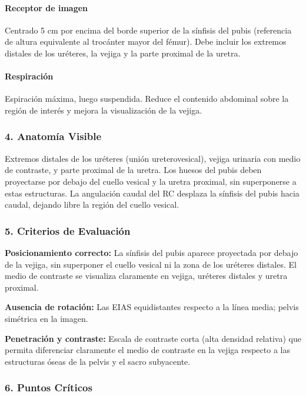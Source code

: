 	\paragraph{Receptor de imagen}
	Centrado 5 cm por encima del borde superior de la sínfisis del pubis (referencia de altura equivalente al trocánter mayor del fémur). Debe incluir los extremos distales de los uréteres, la vejiga y la parte proximal de la uretra.
	
	\paragraph{Respiración}
	Espiración máxima, luego suspendida. Reduce el contenido abdominal sobre la región de interés y mejora la visualización de la vejiga.
	
	\subsubsection*{4. Anatomía Visible}
	
	Extremos distales de los uréteres (unión ureterovesical), vejiga urinaria con medio de contraste, y parte proximal de la uretra. Los huesos del pubis deben proyectarse por debajo del cuello vesical y la uretra proximal, sin superponerse a estas estructuras. La angulación caudal del RC desplaza la sínfisis del pubis hacia caudal, dejando libre la región del cuello vesical.
	
	\subsubsection*{5. Criterios de Evaluación}
	
	\textbf{Posicionamiento correcto:} La sínfisis del pubis aparece proyectada por debajo de la vejiga, sin superponer el cuello vesical ni la zona de los uréteres distales. El medio de contraste se visualiza claramente en vejiga, uréteres distales y uretra proximal.
	
	\textbf{Ausencia de rotación:} Las EIAS equidistantes respecto a la línea media; pelvis simétrica en la imagen.
	
	\textbf{Penetración y contraste:} Escala de contraste corta (alta densidad relativa) que permita diferenciar claramente el medio de contraste en la vejiga respecto a las estructuras óseas de la pelvis y el sacro subyacente.
	
	\subsubsection*{6. Puntos Críticos}
	
